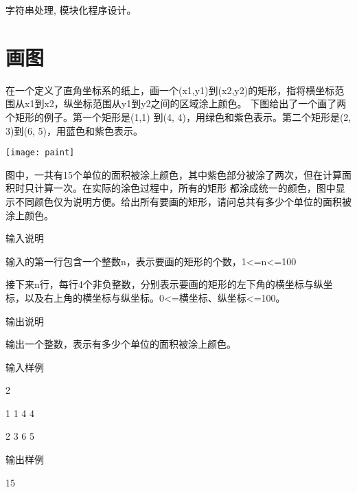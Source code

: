 \begin{note}[要点]
	字符串处理, 模块化程序设计。
\end{note}

\section{画图}
在一个定义了直角坐标系的纸上，画一个(x1,y1)到(x2,y2)的矩形，指将横坐标范围从x1到x2，纵坐标范围从y1到y2之间的区域涂上颜色。    
下图给出了一个画了两个矩形的例子。第一个矩形是(1,1) 到(4, 4)，用绿色和紫色表示。第二个矩形是(2, 3)到(6, 5)，用蓝色和紫色表示。

\texttt{[image: paint]}

图中，一共有15个单位的面积被涂上颜色，其中紫色部分被涂了两次，但在计算面积时只计算一次。在实际的涂色过程中，所有的矩形 都涂成统一的颜色，图中显示不同颜色仅为说明方便。给出所有要画的矩形，请问总共有多少个单位的面积被涂上颜色。

输入说明 
	
输入的第一行包含一个整数n，表示要画的矩形的个数，1<=n<=100   
 
接下来n行，每行4个非负整数，分别表示要画的矩形的左下角的横坐标与纵坐标，以及右上角的横坐标与纵坐标。0<=横坐标、纵坐标<=100。

输出说明	

输出一个整数，表示有多少个单位的面积被涂上颜色。

输入样例
	
2 

1 1 4 4 

2 3 6 5 

输出样例
	
15


